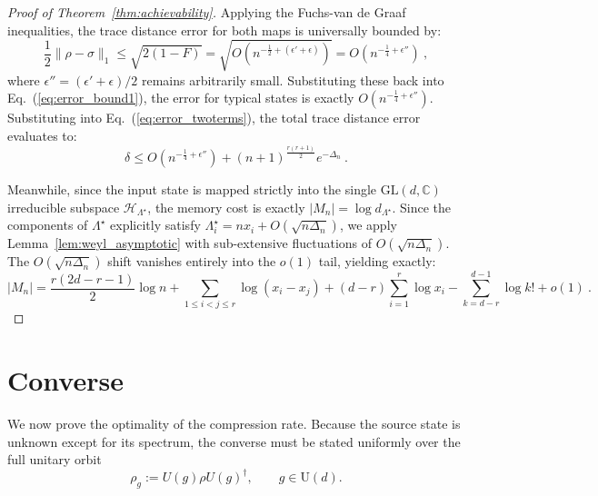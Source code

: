 \documentclass[a4paper,onecolumn,11pt]{quantumarticle}
\begin{document}
\begin{proof}[Proof of Theorem~\ref{thm:achievability}]
Applying the Fuchs-van de Graaf inequalities, the trace distance error for both maps is universally bounded by:
\begin{equation}
    \frac{1}{2}\|\rho - \sigma\|_1 \le \sqrt{2(1-F)} = \sqrt{ O\left( n^{-\frac{1}{2} + (\epsilon'+\epsilon)} \right) } = O\left( n^{-\frac{1}{4} + \epsilon''} \right) \ ,
\end{equation}
where $\epsilon'' = (\epsilon'+\epsilon)/2$ remains arbitrarily small. Substituting these back into Eq.~(\ref{eq:error_bound1}), the error for typical states is exactly $O(n^{-\frac14+\epsilon''})$. Substituting into Eq.~(\ref{eq:error_twoterms}), the total trace distance error evaluates to:
\begin{equation}
    \delta \le O(n^{-\frac14+\epsilon''}) + (n+1)^{\frac{r(r+1)}2} e^{-\Delta_n} \ .
\end{equation}

Meanwhile, since the input state is mapped strictly into the single $\mathrm{GL}(d,\mathbb C)$ irreducible subspace $\mathcal{H}_{\Lambda^\star}$, the memory cost is exactly $|M_n| = \log d_{\Lambda^\star}$. Since the components of $\Lambda^\star$ explicitly satisfy $\Lambda^\star_i = n x_i + O(\sqrt{n\Delta_n})$, we apply Lemma~\ref{lem:weyl_asymptotic} with sub-extensive fluctuations of $O(\sqrt{n\Delta_n})$. The $O(\sqrt{n\Delta_n})$ shift vanishes entirely into the $o(1)$ tail, yielding exactly:
\[
    |M_n| = \frac{r(2d-r-1)}{2}\log n + \sum_{1 \le i < j \le r}\log(x_i-x_j) + (d-r)\sum_{i=1}^r \log x_i - \sum_{k=d-r}^{d-1}\log k! + o(1) \ .
\]
\end{proof}

\section{Converse}\label{sec:converse}

We now prove the optimality of the compression rate.
Because the source state is unknown except for its spectrum, the converse must be stated uniformly over the full unitary orbit
\[
\rho_g :=  U(g)\rho U(g)^\dagger, \qquad g\in \mathrm U(d).
\]
\end{document}
